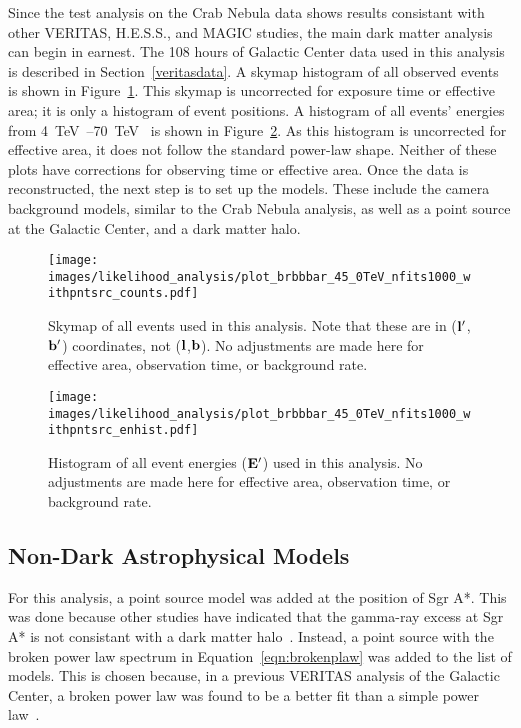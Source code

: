   Since the test analysis on the Crab Nebula data shows results consistant with other VERITAS, H.E.S.S., and MAGIC studies, the main dark matter analysis can begin in earnest.
  The 108 hours of Galactic Center data used in this analysis is described in Section~\ref{veritasdata}.
  A skymap histogram of all observed events is shown in Figure~\ref{fig:gc_counts_skymap}.
  This skymap is uncorrected for exposure time or effective area; it is only a histogram of event positions.
  A histogram of all events' energies from \SIrange{4}{70}{\TeV{}} is shown in Figure~\ref{fig:gc_counts_enhist}.
  As this histogram is uncorrected for effective area, it does not follow the standard power-law shape.
  Neither of these plots have corrections for observing time or effective area.
  Once the data is reconstructed, the next step is to set up the models.
  These include the camera background models, similar to the Crab Nebula analysis, as well as a point source at the Galactic Center, and a dark matter halo.
  
  \begin{figure}[ht]
    \centering
    \texttt{[image: images/likelihood\_analysis/plot\_brbbbar\_45\_0TeV\_nfits1000\_withpntsrc\_counts.pdf]}
    \caption[Galactic Center Counts Skymap]{
      Skymap of all events used in this analysis.
      Note that these are in ($\mathbf{l'}$,$\mathbf{b'}$) coordinates, not ($\mathbf{l }$,$\mathbf{b }$).
      No adjustments are made here for effective area, observation time, or background rate.
    }
    \label{fig:gc_counts_skymap}
  \end{figure}
  
  \begin{figure}[h]
    \centering
    \texttt{[image: images/likelihood\_analysis/plot\_brbbbar\_45\_0TeV\_nfits1000\_withpntsrc\_enhist.pdf]}
    \caption[Galactic Center Counts Energy Histogram]{
      Histogram of all event energies ($\mathbf{E'}$) used in this analysis.
      No adjustments are made here for effective area, observation time, or background rate.
    }
    \label{fig:gc_counts_enhist}
  \end{figure}

  \FloatBarrier

  \subsection{Non-Dark Astrophysical Models}\label{subsec:gcpointsrc}
  For this analysis, a point source model was added at the position of Sgr A*.
  This was done because other studies have indicated that the gamma-ray excess at Sgr A* is not consistant with a dark matter halo~\cite{gc_pnt_is_not_dm1, gc_pnt_is_not_dm2, gc_pnt_is_not_dm3}.
  Instead, a point source with the broken power law spectrum in Equation~\ref{eqn:brokenplaw} was added to the list of models.
  This is chosen because, in a previous VERITAS analysis of the Galactic Center, a broken power law was found to be a better fit than a simple power law~\cite{VeritasGCRidge2015}.
  
